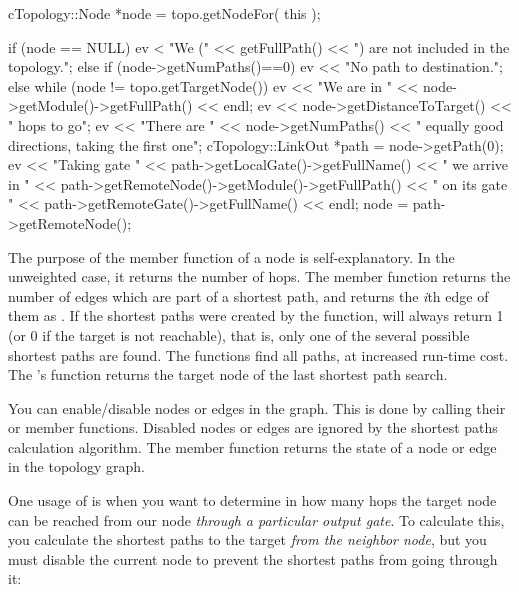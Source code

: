\begin{cpp}
cTopology::Node *node = topo.getNodeFor( this );

if (node == NULL)
{
  ev < "We (" << getFullPath() << ") are not included in the topology.\n";
}
else if (node->getNumPaths()==0)
{
  ev << "No path to destination.\n";
}
else
{
  while (node != topo.getTargetNode())
  {
    ev << "We are in " << node->getModule()->getFullPath() << endl;
    ev << node->getDistanceToTarget() << " hops to go\n";
    ev << "There are " << node->getNumPaths()
       << " equally good directions, taking the first one\n";
    cTopology::LinkOut *path = node->getPath(0);
    ev << "Taking gate " << path->getLocalGate()->getFullName()
       << " we arrive in " << path->getRemoteNode()->getModule()->getFullPath()
       << " on its gate " << path->getRemoteGate()->getFullName() << endl;
    node = path->getRemoteNode();
  }
}
\end{cpp}


The purpose of the  member function of a
node is self-explanatory. In the unweighted case, it returns the
number of hops. The  member function returns the number
of edges which are part of a shortest path, and
 returns the \textit{i}th edge of them as
. If the shortest paths were created by the
 function,
 will always return 1 (or 0 if the target is not
reachable), that is, only one of the several possible shortest paths
are found.  The
 functions
find all paths, at increased run-time cost. The 's
 function returns the target node of the last
shortest path search.

You can enable/disable nodes or edges in the graph. This is done by
calling their  or  member functions.
Disabled nodes or edges are ignored by the shortest paths calculation
algorithm. The  member function returns the state of
a node or edge in the topology graph.

One usage of  is when you want to determine in how many
hops the target node can be reached from our node \textit{through
a particular output gate}. To calculate this, you calculate the
shortest paths to the target \textit{from the neighbor node}, but
you must disable the current node to prevent the shortest paths
from going through it:

